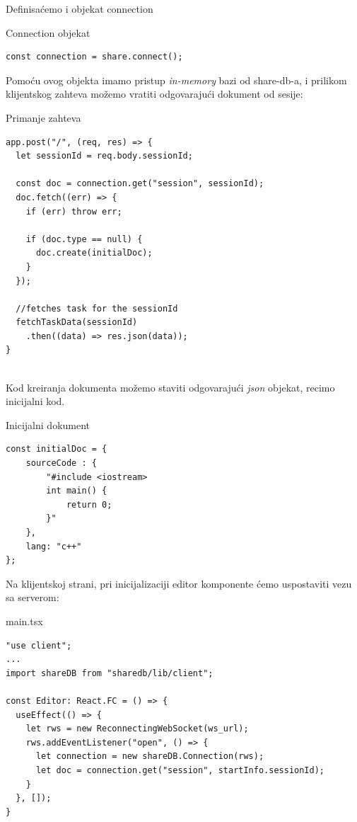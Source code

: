\documentclass[12pt]{article}
\begin{document}
Definisaćemo i objekat connection
\begin{mylisting}[label={lst:example}]{Connection objekat}
\begin{lstlisting}
const connection = share.connect();
\end{lstlisting}
\end{mylisting}

Pomoću ovog objekta imamo pristup \textit{in-memory} bazi od share-db-a, i prilikom klijentskog zahteva možemo vratiti odgovarajući dokument od sesije:

\begin{mylisting}[label={lst:example}]{Primanje zahteva}
\begin{lstlisting}
app.post("/", (req, res) => {
  let sessionId = req.body.sessionId;
  
  const doc = connection.get("session", sessionId);
  doc.fetch((err) => {
    if (err) throw err;

    if (doc.type == null) {
      doc.create(initialDoc);
    }
  });

  //fetches task for the sessionId
  fetchTaskData(sessionId)
    .then((data) => res.json(data));
}
  
\end{lstlisting}
\end{mylisting}

Kod kreiranja dokumenta možemo staviti odgovarajući \textit{json} objekat, recimo inicijalni kod. 

\begin{mylisting}[label={lst:example}]{Inicijalni dokument}
\begin{lstlisting}
const initialDoc = {
    sourceCode : {
        "#include <iostream>
        int main() {
            return 0;
        }"
    },
    lang: "c++"
};
\end{lstlisting}
\end{mylisting}

Na klijentskoj strani, pri inicijalizaciji editor komponente ćemo uspostaviti vezu sa serverom:

\begin{mylisting}[label={lst:example}]{main.tsx}
\begin{lstlisting}
"use client";
...
import shareDB from "sharedb/lib/client";

const Editor: React.FC = () => {
  useEffect(() => {
    let rws = new ReconnectingWebSocket(ws_url);
    rws.addEventListener("open", () => {
      let connection = new shareDB.Connection(rws);
      let doc = connection.get("session", startInfo.sessionId);
    }
  }, []);
}
\end{lstlisting}
\end{mylisting}
\end{document}
